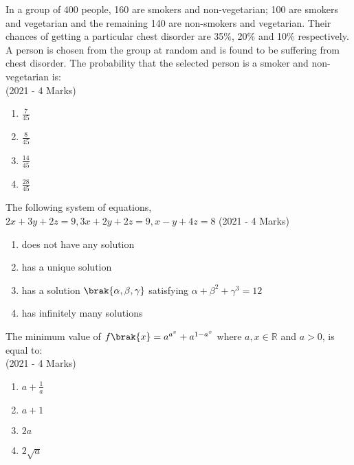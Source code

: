     \item{
            In a group of 400 people, 160 are smokers and non-vegetarian; 100 are smokers and vegetarian and the remaining 140 are non-smokers and vegetarian. Their chances of getting a particular chest disorder are 35\%, 20\% and 10\% respectively. A person is chosen from the group at random and is found to be suffering from chest disorder. The probability that the selected person is a smoker and non-vegetarian is: \\ \text{ }
             \hfill
                {(2021 - 4 Marks)}
			\begin{multicols}{4}
				\begin{enumerate}
					\item $\frac{7}{45}$  
					\item $\frac{8}{45}$  
					\item $\frac{14}{45}$  
					\item $\frac{28}{45}$
				\end{enumerate}
			\end{multicols}
        
        }
    \item{
        	The following system of equations,
            $
            	2x + 3y + 2z = 9 ,
            	3x + 2y + 2z = 9 ,
            	x - y + 4z = 8
            $
             \text{   }\hfill
                {(2021 - 4 Marks)}

                \begin{enumerate}
                   	\item does not have any solution 
                   	\item has a unique solution 
                   	\item has a solution $\brak{\alpha, \beta, \gamma}$ satisfying $\alpha + \beta^2 + \gamma^3 = 12$ 
                   	\item has infinitely many solutions
                \end{enumerate}

        
        }
    \item{
	
			The minimum value of
			$ f\brak{x} = a^{a^{x}} + a^{1-a^{x}}$
			where $a, x \in \mathbb{R}$ and $a > 0$, is equal to:\\
			\text{   }\hfill
			{(2021 - 4 Marks)}
			\begin{multicols}{4}
				\begin{enumerate}
						\item $a + \frac{1}{a}$
						\item $a + 1$
						\item $2a$
						\item $2\sqrt{a}$
				\end{enumerate}
			\end{multicols}
			
		}
